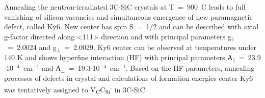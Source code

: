 Annealing the neutron-irradiated 3C-SiC crystals at T~=~900~\degree C leads to full vanishing of silicon vacancies and simultaneous emergence of new paramagnetic defect, called Ky6. New center has spin S~=~1/2 and can be described with axial g-factor directed along <111> direction and with principal parameters g$_\parallel$~=~2.0024 and g$_\perp$~=~2.0029. Ky6 center can be observed at temperatures under 140 K and shows hyperfine interaction (HF) with principal parameters А$_\parallel$~=~23.9$\cdot$10$^{-4}$~cm$^{-1}$ and А$_\perp$~=~19.3$\cdot$10$^{-4}$~cm$^{-1}$. Based on the HF parameters, annealing processes of defects in crystal and calculations of formation energies \citep{brun1} center Ky6 was tentatively assigned to V\textsubscript{C}C\textsubscript{Si}\textsuperscript{-} in 3C-SiC.
